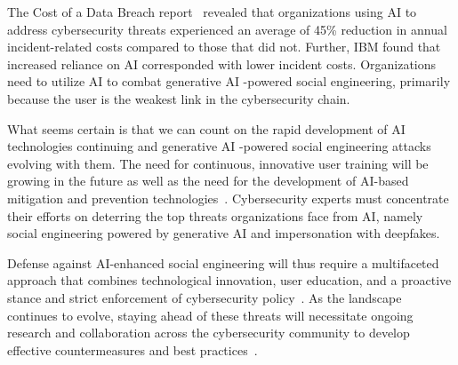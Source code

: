 The Cost of a Data Breach report~\citep{ibm_Cost_Data_Breach_Report_2024} revealed that organizations using AI to address cybersecurity threats experienced an average of 45\% reduction in annual incident-related costs compared to those that did not. Further, IBM found that increased reliance on AI corresponded with lower incident costs. Organizations need to utilize AI to combat generative AI -powered social engineering, primarily because the user is the weakest link in the cybersecurity chain.

What seems certain is that we can count on the rapid development of AI technologies continuing and generative AI -powered social engineering attacks evolving with them. The need for continuous, innovative user training will be growing in the future as well as the need for the development of AI-based mitigation and prevention technologies~\citep{mirsky_Threat_Offensive_AI_Organizations_2023}. Cybersecurity experts must concentrate their efforts on deterring the top threats organizations face from AI, namely social engineering powered by generative AI and impersonation with deepfakes.

%
%
Defense against AI-enhanced social engineering will thus require a multifaceted approach that combines technological innovation, user education, and a proactive stance and strict enforcement of cybersecurity policy~\citep{blauth_AI_Crime_Overview_Malicious_Use_Abuse_2022}. As the landscape continues to evolve, staying ahead of these threats will necessitate ongoing research and collaboration across the cybersecurity community to develop effective countermeasures and best practices~\citep{fakhouri_AI_Driven_Solutions_SE_Attacks_2024}.
